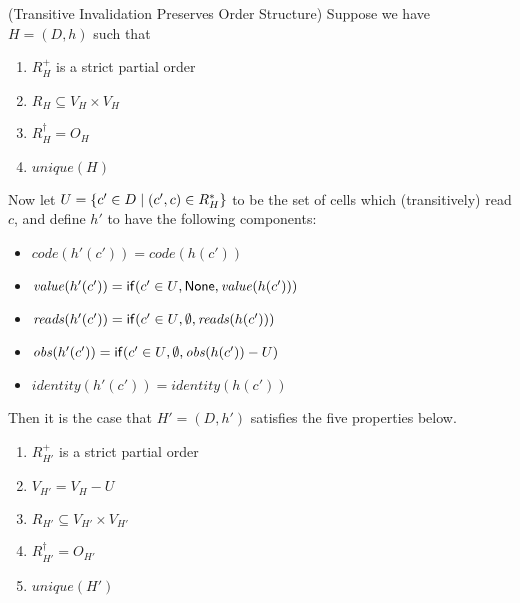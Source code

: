 \begin{lemma}{(Transitive Invalidation Preserves Order Structure)}
Suppose we have $H = (D,h)$ such that 
\begin{enumerate}
\item $R^+_H$ is a strict partial order 
\item $R_H \subseteq V_H \times V_H$
\item $R^\dagger_H = O_H$ 
\item $\mathit{unique}(H)$
\end{enumerate}

Now let $U = \{{{c' \in D}\;|\;{(c',c) \in R^*_H}}\}$ to be the set of
cells which (transitively) read $c$, and define $h'$ to have the
following components:

\begin{itemize}
\item $\mathit{code}(h'(c')) = \mathit{code}(h(c'))$
\item $\mathit{value}(h'(c')) = \mathsf{if}({c'\in U}, {\mathsf{None}}, {\mathit{value}(h(c'))})$
\item $\mathit{reads}(h'(c')) = \mathsf{if}({c'\in U}, {\emptyset}, {\mathit{reads}(h(c'))})$
\item $\mathit{obs}(h'(c')) = \mathsf{if}({c'\in U}, {\emptyset}, {\mathit{obs}(h(c')) - U})$
\item $\mathit{identity}(h'(c')) = \mathit{identity}(h(c'))$
\end{itemize}

\noindent Then it is the case that $H' = (D,h')$ satisfies the five properties below. 
\begin{enumerate}
\item $R^+_{H'}$ is a strict partial order 
\item $V_{H'} = V_H - U$
\item $R_{H'} \subseteq V_{H'} \times V_{H'}$
\item $R^\dagger_{H'} = O_{H'}$ 
\item $\mathit{unique}(H')$
\end{enumerate}
\end{lemma}

